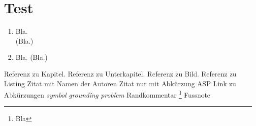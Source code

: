 \chapter{Test}
\label{ch:Test}

\begin{enumerate}
    \item Bla.\\
    (Bla.)
    \item Bla. (Bla.)
\end{enumerate}

 Referenz zu Kapitel.
 Referenz zu Unterkapitel. 
 Referenz zu Bild.
 Referenz zu Listing
\textcite{Jan+10} Zitat mit Namen der Autoren
\cite{Jan+10} Zitat nur mit Abkürzung
\ac{ASP} Link zu Abkürzungen
\emph{symbol grounding problem} 
 Randkommentar
\footnote{Bla} Fussnote

